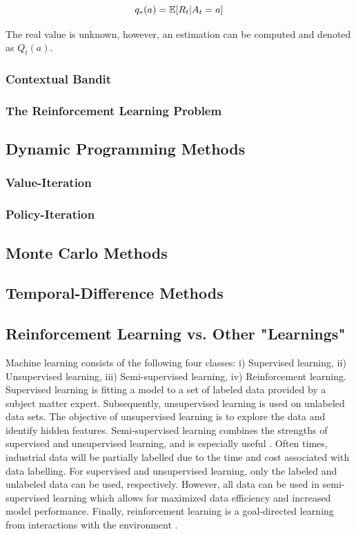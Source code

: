 \begin{equation}
    \centering
    q_*(a) = \mathbb{E}[R_t | A_t = a]
    \label{eq: value}
\end{equation}

The real value is unknown, however, an estimation can be computed and denoted as $Q_t(a)$.

\subsubsection{Contextual Bandit}
\subsubsection{The Reinforcement Learning Problem}

\subsection{Dynamic Programming Methods}
\subsubsection{Value-Iteration}
\subsubsection{Policy-Iteration}
\subsection{Monte Carlo Methods}
\subsection{Temporal-Difference Methods}
\subsection{Reinforcement Learning vs. Other "Learnings"}

Machine learning consists of the following four classes: i) Supervised learning, ii) Unsupervised learning, iii) Semi-supervised learning, iv) Reinforcement learning.  Supervised learning is fitting a model to a set of labeled data provided by a subject matter expert.  Subsequently, unsupervised learning is used on unlabeled data sets.  The objective of unsupervised learning is to explore the data and identify hidden features. Semi-supervised learning combines the strengths of supervised and unsupervised learning, and is especially useful \cite{machine_learning}.  Often times, industrial data will be partially labelled due to the time and cost associated with data labelling.  For supervised and unsupervised learning, only the labeled and unlabeled data can be used, respectively.  However, all data can be used in semi-supervised learning which allows for maximized data efficiency and increased model performance. Finally, reinforcement learning is a goal-directed learning from interactions with the environment \cite{sutton}.

